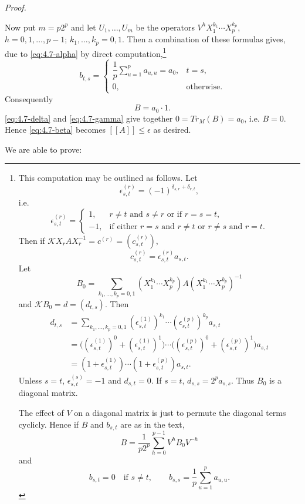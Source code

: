 \documentclass[b5paper,twoside]{article}
\theoremstyle{mvnplain}
\renewenvironment{proof}[1][Proof]{%
  \par\addvspace{0.35\baselineskip}%
  \noindent\textit{#1.}\ \normalfont\ignorespaces
}{%
  \par\addvspace{0.35\baselineskip}%
}
\newcommand{\M}{\mathbf M}
\newcommand{\Metric}[1]{\left[\!\left[#1\right]\!\right]}
\def\M{M}%
\def\Metric#1{[[#1]]}%
\def\operatorname#1{#1}%
\begin{document}
\begin{proof}
Now put \(m=p2^p\) and let \(U_1,\ldots,U_m\) be the operators
\(V^hX_1^{k_1}\cdots X_p^{k_p}\),
\(h=0,1,\ldots,p-1\); \(k_1,\ldots,k_p=0,1\). Then a combination of
these formulas gives, due to \eqref{eq:4.7-alpha} by direct
computation,\footnote{This computation may be outlined as follows. Let
\[
 \epsilon_{s,t}^{(r)}=(-1)^{\delta_{s,r}+\delta_{r,t}},
\]
i.e.
\[
 \epsilon_{s,t}^{(r)}=\begin{cases}
 1,&r\ne t\text{ and }s\ne r\text{ or if }r=s=t,\\
 -1,&\text{if either }r=s\text{ and }r\ne t\text{ or }r\ne s\text{ and }r=t.
 \end{cases}
\]
Then if \(\mathcal KX_rAX_r^{-1}=c^{(r)}=(c_{s,t}^{(r)})\),
\[
 c_{s,t}^{(r)}=\epsilon_{s,t}^{(r)}a_{s,t}.
\]
Let
\[
 B_0=\sum_{k_1,\ldots,k_p=0,1}
 (X_1^{k_1}\cdots X_p^{k_p})A
 (X_1^{k_1}\cdots X_p^{k_p})^{-1}
\]
and \(\mathcal KB_0=d=(d_{t,s})\). Then
\begin{align*}
 d_{t,s}
 &=\sum_{k_1,\ldots,k_p=0,1}
   (\epsilon_{s,t}^{(1)})^{k_1}\cdots
   (\epsilon_{s,t}^{(p)})^{k_p}a_{s,t}\\
 &=\bigl((\epsilon_{s,t}^{(1)})^0+(\epsilon_{s,t}^{(1)})^1\bigr)
   \cdots
   \bigl((\epsilon_{s,t}^{(p)})^0+(\epsilon_{s,t}^{(p)})^1\bigr)a_{s,t}\\
 &=(1+\epsilon_{s,t}^{(1)})\cdots
   (1+\epsilon_{s,t}^{(p)})a_{s,t}.
\end{align*}
Unless \(s=t\), \(\epsilon_{s,t}^{(s)}=-1\) and \(d_{s,t}=0\). If
\(s=t\), \(d_{s,s}=2^pa_{s,s}\). Thus \(B_0\) is a diagonal matrix.

The effect of \(V\) on a diagonal matrix is just to permute the diagonal
terms cyclicly. Hence if \(B\) and \(b_{s,t}\) are as in the text,
\[
 B=\frac1{p2^p}\sum_{h=0}^{p-1}V^hB_0V^{-h}
\]
and
\[
 b_{s,t}=0\quad\text{if }s\ne t,
 \qquad b_{s,s}=\frac1p\sum_{u=1}^{p}a_{u,u}.
\]}
\[
 b_{t,s}=\begin{cases}
 \dfrac1p\displaystyle\sum_{u=1}^{p}a_{u,u}=a_0,&t=s,\\
 0,&\text{otherwise}.
 \end{cases}
\]
Consequently
\begin{equation}\tag{4.7.\(\delta\)}\label{eq:4.7-delta}
 B=a_0\cdot1.
\end{equation}
\eqref{eq:4.7-delta} and \eqref{eq:4.7-gamma} give together
\(0=\operatorname{Tr}_{\M}(B)=a_0\), i.e. \(B=0\). Hence
\eqref{eq:4.7-beta} becomes \(\Metric{A}\leq\epsilon\) as desired.
\end{proof}

We are able to prove:
\end{document}

